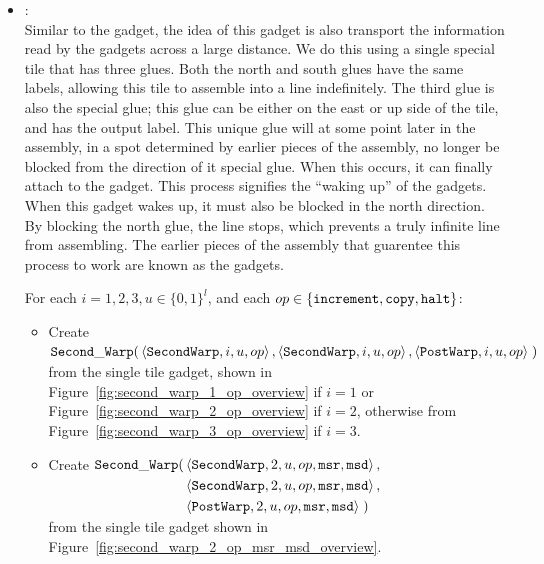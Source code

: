 \begin{itemize}
    \item {\secondwarp}: \\
    Similar to the {\firstwarp} gadget, the idea of this gadget is also transport the information read by the {\cread} gadgets across a large distance.
    We do this using a single special tile that has three glues.
    Both the north and south glues have the same labels, allowing this tile to assemble into a line indefinitely.
    The third glue is also the special glue; this glue can be either on the east or up side of the tile, and has the output label.
    This unique glue will at some point later in the assembly, in a spot determined by earlier pieces of the assembly, no longer be blocked from the direction of it special glue.
    When this occurs, it can finally attach to the {\postwarp} gadget.
    This process signifies the ``waking up'' of the {\secondwarp} gadgets.
    When this gadget wakes up, it must also be blocked in the north direction.
    By blocking the north glue, the line stops, which prevents a truly infinite line from assembling.
    The earlier pieces of the assembly that guarentee this process to work are known as the {\dtop} gadgets.

    For each $i = 1,2,3, u \in \{0, 1\}^l$, and each $op \in \{ {\tt increment}, {\tt copy}, {\tt halt} \}$:
    \begin{itemize}
        \item Create
        $\begin{aligned}[t]
            \secondwarp(& \left\langle {\tt SecondWarp}, i, u, \inc \right\rangle,     %
                          \left\langle {\tt SecondWarp}, i, u, \inc \right\rangle,     %
                          \left\langle {\tt PostWarp},   i, u, \inc \right\rangle \;)  %
        \end{aligned}$\\ from the single tile gadget, shown in Figure~\ref{fig:second_warp_1_op_overview}
                         if $i = 1$ or Figure~\ref{fig:second_warp_2_op_overview} if $i = 2$, otherwise from
                         Figure~\ref{fig:second_warp_3_op_overview} if $i = 3$.
        \vspace{0.5cm}

        \item Create
        $\begin{aligned}[t]
            \secondwarp(& \left\langle {\tt SecondWarp}, 2, u, \inc, {\tt msr}, {\tt msd} \right\rangle, \\ %
                        & \left\langle {\tt SecondWarp}, 2, u, \inc, {\tt msr}, {\tt msd} \right\rangle, \\ %
                        & \left\langle {\tt PostWarp},   2, u, \inc, {\tt msr}, {\tt msd} \right\rangle \;) %
        \end{aligned}$\\ from the single tile gadget shown in Figure~\ref{fig:second_warp_2_op_msr_msd_overview}.
        \vspace{0.5cm}


\end{itemize}
\end{itemize}
